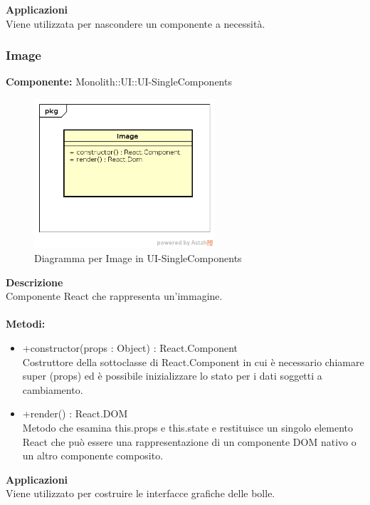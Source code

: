 \textbf{Applicazioni}\\
Viene utilizzata per nascondere un componente a necessità. 


\clearpage

\subsubsection{Image}
\textbf{Componente:}  Monolith::UI::UI-SingleComponents\\
   \FloatBarrier
   \begin{figure}[ht]
   \centering
   \includegraphics[width=0.6\textwidth]{img/single-Image}
   \caption{{Diagramma per Image in UI-SingleComponents}}
\end{figure}
\FloatBarrier
\textbf{Descrizione}\\
Componente React che rappresenta un'immagine. \\\\
\textbf{Metodi:} \begin{itemize}\item +constructor(props : Object) : React.Component \\Costruttore della sottoclasse di React.Component in cui è necessario chiamare super (props) ed è possibile inizializzare lo stato per i dati soggetti a cambiamento.\item +render() : React.DOM \\Metodo che esamina this.props e this.state e restituisce un singolo elemento React che può essere una rappresentazione di un componente DOM nativo o un altro componente composito.\end{itemize} 


\textbf{Applicazioni}\\
Viene utilizzato per costruire le interfacce grafiche delle bolle. 


\clearpage

